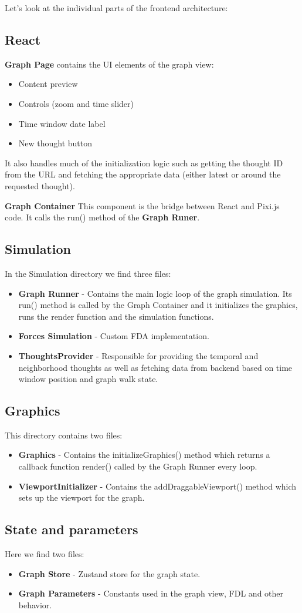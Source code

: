 Let's look at the individual parts of the frontend architecture:
\subsection*{React}
\textbf{Graph Page} contains the UI elements of the graph view:
\begin{itemize}
    \item Content preview
    \item Controls (zoom and time slider)
    \item Time window date label
    \item New thought button
\end{itemize}
It also handles much of the initialization logic such as getting the thought ID from the URL and fetching the appropriate data
(either latest or around the requested thought).

\textbf{Graph Container}
This component is the bridge between React and Pixi.js code. It calls the run() method of the \textbf{Graph Runer}.

\subsection*{Simulation}
In the Simulation directory we find three files:
\begin{itemize}
    \item \textbf{Graph Runner} - Contains the main logic loop of the graph simulation.
    Its run() method is called by the Graph Container and it initializes the graphics,
    runs the render function and the simulation functions.
    \item \textbf{Forces Simulation} - Custom FDA implementation.
    \item \textbf{ThoughtsProvider} - Responsible for providing the temporal and neighborhood thoughts as well as
    fetching data from backend based on time window position and graph walk state.
\end{itemize}

\subsection*{Graphics}
This directory contains two files:
\begin{itemize}
    \item \textbf{Graphics} - Contains the initializeGraphics() method which returns a callback function render()
    called by the Graph Runner every loop.
    \item \textbf{ViewportInitializer} - Contains the addDraggableViewport() method
    which sets up the viewport for the graph. 
\end{itemize}

\subsection*{State and parameters}
Here we find two files:
\begin{itemize}
    \item \textbf{Graph Store} - Zustand store for the graph state.
    \item \textbf{Graph Parameters} - Constants used in the graph view, \gls{FDL} and other behavior.
\end{itemize}

